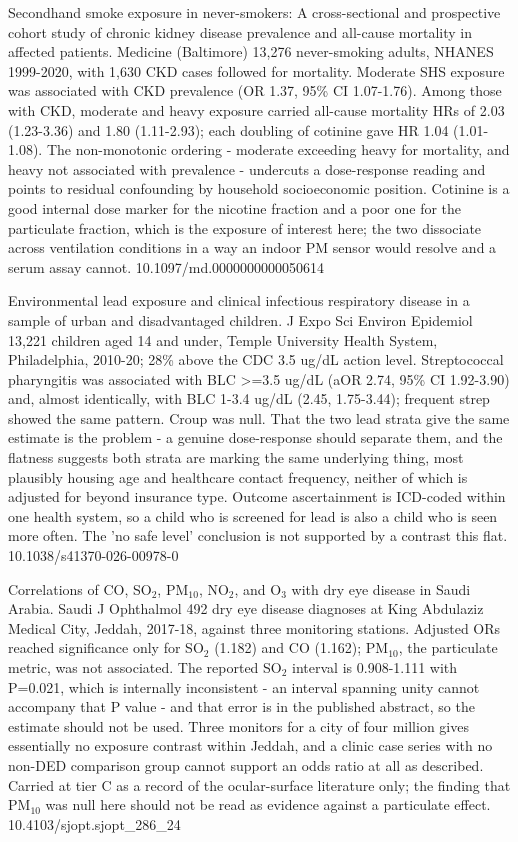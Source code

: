 \documentclass[10pt]{article}
\begin{document}
{Secondhand smoke exposure in never-smokers: A cross-sectional and prospective cohort study of chronic kidney disease prevalence and all-cause mortality in affected patients.}
{Medicine (Baltimore)}
{13,276 never-smoking adults, NHANES 1999-2020, with 1,630 CKD cases followed for mortality. Moderate SHS exposure was associated with CKD prevalence (OR 1.37, 95\% CI 1.07-1.76). Among those with CKD, moderate and heavy exposure carried all-cause mortality HRs of 2.03 (1.23-3.36) and 1.80 (1.11-2.93); each doubling of cotinine gave HR 1.04 (1.01-1.08). The non-monotonic ordering - moderate exceeding heavy for mortality, and heavy not associated with prevalence - undercuts a dose-response reading and points to residual confounding by household socioeconomic position. Cotinine is a good internal dose marker for the nicotine fraction and a poor one for the particulate fraction, which is the exposure of interest here; the two dissociate across ventilation conditions in a way an indoor PM sensor would resolve and a serum assay cannot.}
{10.1097/md.0000000000050614}

{Environmental lead exposure and clinical infectious respiratory disease in a sample of urban and disadvantaged children.}
{J Expo Sci Environ Epidemiol}
{13,221 children aged 14 and under, Temple University Health System, Philadelphia, 2010-20; 28\% above the CDC 3.5 ug/dL action level. Streptococcal pharyngitis was associated with BLC >=3.5 ug/dL (aOR 2.74, 95\% CI 1.92-3.90) and, almost identically, with BLC 1-3.4 ug/dL (2.45, 1.75-3.44); frequent strep showed the same pattern. Croup was null. That the two lead strata give the same estimate is the problem - a genuine dose-response should separate them, and the flatness suggests both strata are marking the same underlying thing, most plausibly housing age and healthcare contact frequency, neither of which is adjusted for beyond insurance type. Outcome ascertainment is ICD-coded within one health system, so a child who is screened for lead is also a child who is seen more often. The 'no safe level' conclusion is not supported by a contrast this flat.}
{10.1038/s41370-026-00978-0}

{Correlations of CO, SO$_2$, PM$_{10}$, NO$_2$, and O$_3$ with dry eye disease in Saudi Arabia.}
{Saudi J Ophthalmol}
{492 dry eye disease diagnoses at King Abdulaziz Medical City, Jeddah, 2017-18, against three monitoring stations. Adjusted ORs reached significance only for SO$_2$ (1.182) and CO (1.162); PM$_{10}$, the particulate metric, was not associated. The reported SO$_2$ interval is 0.908-1.111 with P=0.021, which is internally inconsistent - an interval spanning unity cannot accompany that P value - and that error is in the published abstract, so the estimate should not be used. Three monitors for a city of four million gives essentially no exposure contrast within Jeddah, and a clinic case series with no non-DED comparison group cannot support an odds ratio at all as described. Carried at tier C as a record of the ocular-surface literature only; the finding that PM$_{10}$ was null here should not be read as evidence against a particulate effect.}
{10.4103/sjopt.sjopt_286_24}
\end{document}
